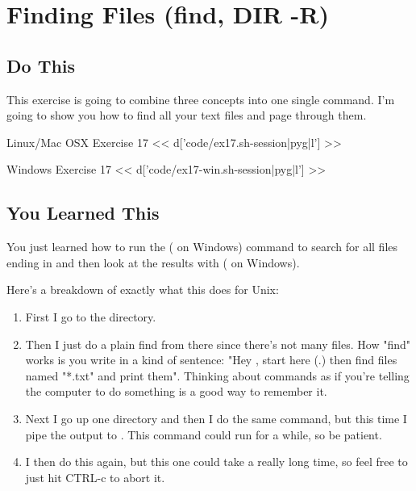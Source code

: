 \chapter{Finding Files (find, DIR -R)}

\section{Do This}

This exercise is going to combine three concepts into one single command.  I'm
going to show you how to find all your text files and page through them.

\begin{code}{Linux/Mac OSX Exercise 17}
<< d['code/ex17.sh-session|pyg|l'] >>
\end{code}

\begin{code}{Windows Exercise 17}
<< d['code/ex17-win.sh-session|pyg|l'] >>
\end{code}

\section{You Learned This}

You just learned how to run the  ( on Windows) command to search for all files
ending in  and then look at the results with  ( on Windows).

Here's a breakdown of exactly what this does for Unix:

\begin{enumerate}
\item First I go to the  directory.
\item Then I just do a plain find from there since there's not many 
files.  How "find" works is you write in a kind of sentence: "Hey ,
    start here (.) then find files named "*.txt" and print them".  Thinking
    about commands as if you're telling the computer to do something is a good
    way to remember it.
\item Next I go up one directory and then I do the same command, but this time I pipe the output to .  This command could run for a while, so be patient.
\item I then do this again, but this one could take a really long time, so feel free to just hit CTRL-c to abort it.
\end{enumerate}

